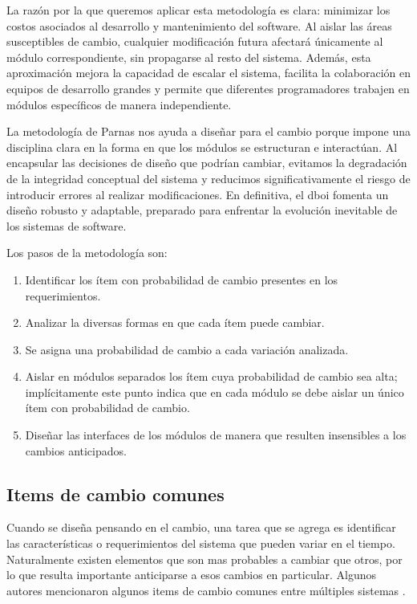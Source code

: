 La razón por la que queremos aplicar esta metodología es clara: minimizar los costos asociados al desarrollo y mantenimiento del software. Al aislar las áreas susceptibles de cambio, cualquier modificación futura afectará únicamente al módulo correspondiente, sin propagarse al resto del sistema. Además, esta aproximación mejora la capacidad de escalar el sistema, facilita la colaboración en equipos de desarrollo grandes y permite que diferentes programadores trabajen en módulos específicos de manera independiente.

La metodología de Parnas nos ayuda a diseñar para el cambio porque impone una disciplina clara en la forma en que los módulos se estructuran e interactúan. Al encapsular las decisiones de diseño que podrían cambiar, evitamos la degradación de la integridad conceptual del sistema y reducimos significativamente el riesgo de introducir errores al realizar modificaciones. En definitiva, el \gls{dboi} fomenta un diseño robusto y adaptable, preparado para enfrentar la evolución inevitable de los sistemas de software.


Los pasos de la metodología son:

\begin{enumerate}
	\item Identificar los ítem con probabilidad de cambio presentes en los requerimientos.
	\item Analizar la diversas formas en que cada ítem puede cambiar.
	\item Se asigna una probabilidad de cambio a cada variación analizada.
	\item Aislar en módulos separados los ítem cuya probabilidad de cambio sea alta; implícitamente este punto indica que en cada módulo se debe aislar un único ítem con probabilidad de cambio.
	\item Diseñar las interfaces de los módulos de manera que resulten insensibles a los cambios anticipados.

\end{enumerate}



\subsection{Items de cambio comunes}
\label{listaItems}

Cuando se diseña pensando en el cambio, una tarea que se agrega es identificar las características o requerimientos del sistema que pueden variar en el tiempo. Naturalmente existen elementos que son mas probables a cambiar que otros, por lo que resulta importante anticiparse a esos cambios en particular. Algunos autores mencionaron algunos items de cambio comunes entre múltiples sistemas \cite{Parnas02}.


